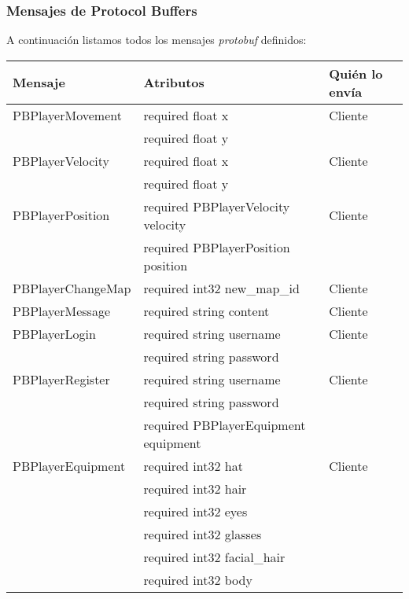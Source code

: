 
\subsubsection{Mensajes de Protocol Buffers}

A continuación listamos todos los mensajes \textit{protobuf} definidos:

\label{apendix:protobuf}
\begin{longtable}{|l|l|l|}
    \hline
    \textbf{Mensaje} & \textbf{Atributos} & \textbf{Quién lo envía} \\
    \hline
    PBPlayerMovement & required float x & Cliente \\
                        & required float y & \\
    \hline
    PBPlayerVelocity & required float x & Cliente \\
                        & required float y & \\
    \hline
    PBPlayerPosition & required PBPlayerVelocity velocity & Cliente \\
                        & required PBPlayerPosition position & \\
    \hline
    PBPlayerChangeMap & required int32 new\_map\_id & Cliente \\
    \hline
    PBPlayerMessage & required string content & Cliente \\
    \hline
    PBPlayerLogin & required string username & Cliente \\
                    & required string password & \\
    \hline
    PBPlayerRegister & required string username & Cliente \\
                        & required string password & \\
                        & required PBPlayerEquipment equipment & \\
    \hline
    PBPlayerEquipment & required int32 hat & Cliente \\
                        & required int32 hair & \\
                        & required int32 eyes & \\
                        & required int32 glasses & \\
                        & required int32 facial\_hair & \\
                        & required int32 body & \\

\end{longtable}
